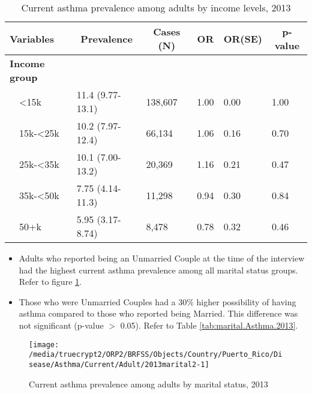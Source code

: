 \begin{table}[H]
\caption{Current asthma prevalence  among adults by income levels, 2013\label{tab:income.Asthma.2013}} 
\begin{center}
\begin{tabular}{llllll}
\hline\hline
\multicolumn{1}{l}{Variables}&\multicolumn{1}{c}{Prevalence}&\multicolumn{1}{c}{Cases (N)}&\multicolumn{1}{c}{OR}&\multicolumn{1}{c}{OR(SE)}&\multicolumn{1}{c}{p-value}\tabularnewline
\hline
{\bfseries Income group}&&&&&\tabularnewline
~~\textless15k&11.4 (9.77-13.1)&138,607&1.00&0.00&1.00\tabularnewline
~~15k-\textless25k&10.2 (7.97-12.4)& 66,134&1.06&0.16&0.70\tabularnewline
~~25k-\textless35k&10.1 (7.00-13.2)& 20,369&1.16&0.21&0.47\tabularnewline
~~35k-\textless50k&7.75 (4.14-11.3)& 11,298&0.94&0.30&0.84\tabularnewline
~~50+k&5.95 (3.17-8.74)&  8,478&0.78&0.32&0.46\tabularnewline
\hline
\end{tabular}\end{center}

\end{table}

 \newpage
\begin{itemize}

\item Adults who reported being an Unmarried Couple at the time of the interview had the highest current asthma prevalence among all marital status groups. Refer to figure \ref{fig:marital.Asthma.2013}.

\item Those who were Unmarried Couples had a 30\% higher possibility of having asthma compared to those who reported being Married. This difference was not significant (p-value $>$ 0.05). Refer to Table \ref{tab:marital.Asthma.2013}.

\end{itemize}

\begin{figure}[H]
\caption{Current asthma prevalence among adults by marital status,
         2013}
\label{fig:marital.Asthma.2013}
\begin{knitrout}
\color{fgcolor}

{\centering \texttt{[image: /media/truecrypt2/ORP2/BRFSS/Objects/Country/Puerto\_Rico/Disease/Asthma/Current/Adult/2013marital2-1]} 

}



\end{knitrout}
 \end{figure}


